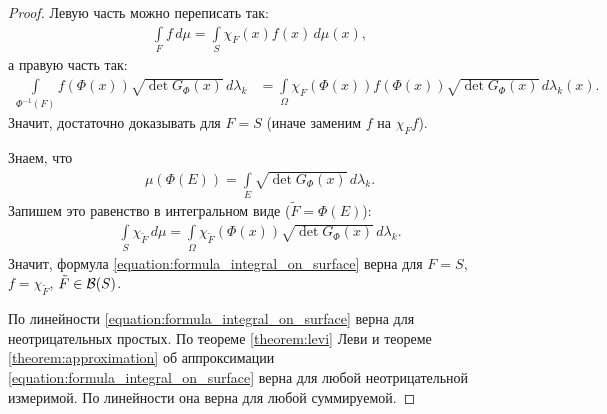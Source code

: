 \begin{proof}
 Левую часть можно переписать так:
 \begin{align*}
  \int\limits_{F} f \, d\mu = \int\limits_{S} \chi_F(x) f(x) \, d\mu  (x)
 ,\end{align*}  а правую часть так:
 \begin{align*}
  \int\limits_{\Phi^{-1}(F)} f(\Phi(x)) \sqrt{\det G_{\Phi}(x)}\, d\lambda_k &= \int\limits_{\Omega} \chi_F(\Phi(x)) f(\Phi(x)) \sqrt{\det G_{\Phi}(x)} \, d\lambda_k(x)
 .\end{align*} Значит, достаточно доказывать для $F = S$  (иначе заменим $f$ на $\chi_F f$).

 Знаем, что
 \begin{align*}
  \mu(\Phi(E)) = \int\limits_{E} \sqrt{\det G_{\Phi}(x)} \, d\lambda_k
 .\end{align*}  Запишем это равенство в интегральном виде ($\tilde F = \Phi(E)$):
 \begin{align*}
  \int\limits_{S} \chi_{\tilde F} \, d\mu  = \int\limits_{\Omega} \chi_{\tilde F}(\Phi(x)) \sqrt{\det G_{\Phi}(x)}\, d\lambda_k
 .\end{align*} Значит, формула \eqref{equation:formula_integral_on_surface} верна для $F = S$, $f = \chi_{\tilde F}$, $\tilde F \in \mathcal{B}(S)$.

 По линейности \eqref{equation:formula_integral_on_surface} верна для неотрицательных простых. По теореме \ref{theorem:levi} Леви и теореме \ref{theorem:approximation} об аппроксимации \eqref{equation:formula_integral_on_surface} верна для любой неотрицательной измеримой. По линейности она верна для любой суммируемой.
\end{proof}

